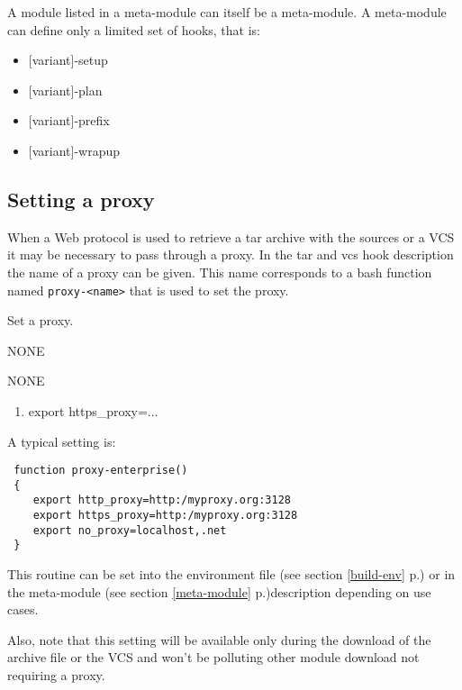 \documentclass[a4paper,12pt,twoside]{article}
\newcommand{\code}[1]{\texttt{#1}}
\newcommand{\seeref}[1]{see section \ref{#1} p.\pageref{#1}}
\begin{document}
A module listed in a meta-module can itself be a meta-module. A meta-module can define only a limited set of hooks, that is:

\begin{itemize}[font=\texttt]
	\item {[variant]-setup}
	\item {[variant]-plan}
	\item {[variant]-prefix}
	\item {[variant]-wrapup}
\end{itemize}

\subsection{Setting a proxy}
\label{proxy}

When a Web protocol is used to retrieve a tar archive with the sources or a VCS it may be necessary to pass through a proxy. In the tar and vcs hook description the name of a proxy can be given. This name corresponds to a bash function named \code{proxy-<name>} that is used to set the proxy.

\begin{description}[style=nextline]
	\item[proxy-<name>] Set a proxy.
	\begin{description}[font=\textit,style=standard]
		\item[parameter] \tabto{2cm} NONE
		\item[return] \tabto{2cm} NONE
		\begin{enumerate}
			\item export https\_proxy=...
		\end{enumerate}
	\end{description}
\end{description}

A typical setting is:

\begin{lstlisting}
 function proxy-enterprise()
 {
    export http_proxy=http:/myproxy.org:3128
    export https_proxy=http:/myproxy.org:3128
    export no_proxy=localhost,.net
 }
\end{lstlisting}

This routine can be set into the environment file (\seeref{build-env}) or in the meta-module (\seeref{meta-module})description depending on use cases.

Also, note that this setting will be available only during the download of the archive file or the VCS and won't be polluting other module download not requiring a proxy.
\end{document}
